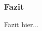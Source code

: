 \begin{frame} %
  \frametitle{Fazit} %
  \begin{definition} %
    Fazit hier...
  \end{definition}
\end{frame}